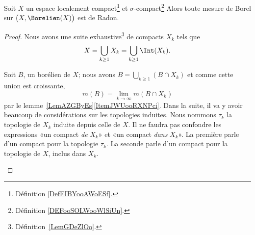 \begin{proposition}     \label{PropNCASooBnbFrc}
	Soit \( X\) un espace localement compact\footnote{Définition \ref{DefEIBYooAWoESf}.} et \( \sigma\)-compact\footnote{Définition \ref{DEFooSOLWooWlSiUn}.} Alors toute mesure de Borel sur \( \big( X,\Borelien(X) \big)\) est de Radon.
\end{proposition}

\begin{proof}
	Nous avons une suite exhaustive\footnote{Définition~\ref{LemGDeZlOo}.} de compacts \( X_k\) tels que
	\begin{equation}
		X=\bigcup_{k\geq 1}X_k=\bigcup_{k\geq 1}\Int(X_k).
	\end{equation}
	\begin{subproof}
		Soit \( B\), un borélien de \( X\); nous avons \( B=\bigcup_{k\geq 1}(B\cap X_k)\) et comme cette union est croissante,
		\begin{equation}
			m(B)=\lim_{k\to \infty} m(B\cap X_k)
		\end{equation}
		par le lemme~\ref{LemAZGByEs}\ref{ItemJWUooRXNPci}. Dans la suite, il va y avoir beaucoup de considérations sur les topologies induites. Nous nommons \( \tau_k\) la topologie de \( X_k\) induite depuis celle de \( X\). Il ne faudra pas confondre les expressions «un compact \emph{de} \( X_k\)»  et «un compact \emph{dans} \( X_k\)». La première parle d'un compact pour la topologie \( \tau_k\). La seconde parle d'un compact pour la topologie de \( X\), inclus dans \( X_k\).



\end{subproof}
\end{proof}
